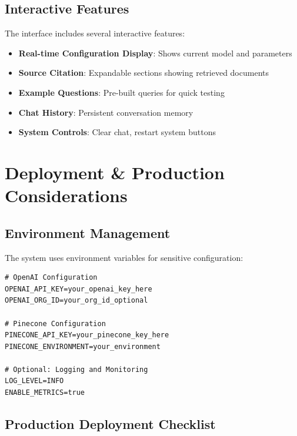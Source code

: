 \documentclass[12pt,a4paper]{article}
\begin{document}
\subsection{Interactive Features}

The interface includes several interactive features:

\begin{itemize}
    \item \textbf{Real-time Configuration Display}: Shows current model and parameters
    \item \textbf{Source Citation}: Expandable sections showing retrieved documents
    \item \textbf{Example Questions}: Pre-built queries for quick testing
    \item \textbf{Chat History}: Persistent conversation memory
    \item \textbf{System Controls}: Clear chat, restart system buttons
\end{itemize}

\section{Deployment \& Production Considerations}

\subsection{Environment Management}

The system uses environment variables for sensitive configuration:

\begin{lstlisting}[caption=Environment Configuration (env/api\_keys.env)]
# OpenAI Configuration
OPENAI_API_KEY=your_openai_key_here
OPENAI_ORG_ID=your_org_id_optional

# Pinecone Configuration  
PINECONE_API_KEY=your_pinecone_key_here
PINECONE_ENVIRONMENT=your_environment

# Optional: Logging and Monitoring
LOG_LEVEL=INFO
ENABLE_METRICS=true
\end{lstlisting}

\subsection{Production Deployment Checklist}
\end{document}
